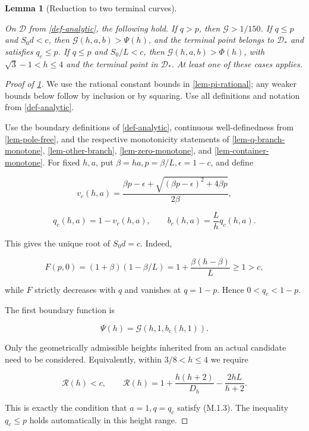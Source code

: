\documentclass[11pt,a4paper]{article}
\theoremstyle{proofmanuscript}
\newtheorem{lemma}[theorem]{Lemma}
\begin{document}
\begin{lemma}[Reduction to two terminal curves]\label{lem-boundary}

On \(\mathcal D\) from \ref{def-analytic}, the following hold. If \(q>p\), then \(\mathcal G>1/150\). If \(q\le p\) and \(S_0d<c\), then \(\mathcal G(h,a,b)>\Psi(h)\), and the terminal point belongs to \(\mathcal D_*\) and satisfies \(q_c\le p\). If \(q\le p\) and \(S_0/L<c\), then \(\mathcal G(h,a,b)>\Phi(h)\), with \(\sqrt3-1<h\le4\) and the terminal point in \(\mathcal D_*\). At least one of these cases applies.

\end{lemma}

\begin{proof}[Proof of \ref{lem-boundary}]

We use the rational constant bounds in \ref{lem-pi-rational}; any weaker bounds below follow by inclusion or by squaring. Use all definitions and notation from \ref{def-analytic}.

Use the boundary definitions of \ref{def-analytic}, continuous well-definedness from \ref{lem-pole-free}, and the respective monotonicity statements of \ref{lem-q-branch-monotone}, \ref{lem-other-branch}, \ref{lem-zero-monotone}, and \ref{lem-container-monotone}. For fixed \(h,a\), put \(\beta=ha,p=\beta/L,\epsilon=1-c\), and define

\[
v_c(h,a)=
\frac{\beta p-\epsilon+
\sqrt{(\beta p-\epsilon)^2+4\beta p}}{2\beta},
\]

\[
q_c(h,a)=1-v_c(h,a),\qquad b_c(h,a)=\frac Lh q_c(h,a).
                                                                  \tag{M.7.1}
\]

This gives the unique root of \(S_0d=c\). Indeed,

\[
F(p,0)=(1+\beta)(1-\beta/L)
=1+\frac{\beta(h-\beta)}L\ge1>c,
\]

while \(F\) strictly decreases with \(q\) and vanishes at \(q=1-p\). Hence \(0<q_c<1-p\).

The first boundary function is

\[
\boxed{\Psi(h)=\mathcal G(h,1,b_c(h,1)).}                 \tag{M.7.2}
\]

Only the geometrically admissible heights inherited from an actual candidate need to be considered. Equivalently, within \(3/8<h\le4\) we require

\[
\mathscr R(h)<c,\qquad
\mathscr R(h)=
1+\frac{h(h+2)}{D_h}-\frac{2hL}{h+2}.                    \tag{M.7.3}
\]

This is exactly the condition that \(a=1,q=q_c\) satisfy (M.1.3). The inequality \(q_c\le p\) holds automatically in this height range.


\end{proof}
\end{document}
